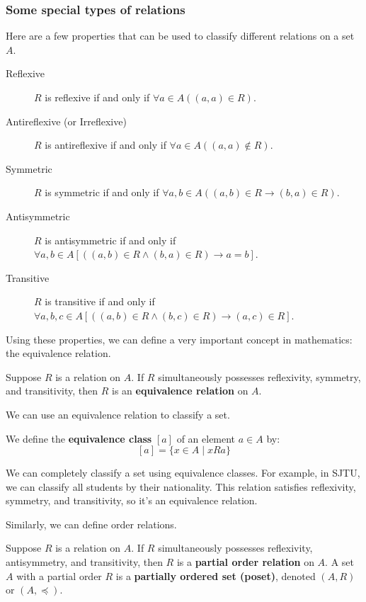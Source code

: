 \subsubsection{Some special types of relations}
Here are a few properties that can be used to classify different relations on a set $A$.
\begin{description}
    \item[Reflexive] $R$ is reflexive if and only if $\forall a \in A ((a,a) \in R)$.
    \item[Antireflexive (or Irreflexive)] $R$ is antireflexive if and only if $\forall a \in A ((a,a) \notin R)$.
    \item[Symmetric] $R$ is symmetric if and only if $\forall a,b \in A ((a,b) \in R \to (b,a) \in R)$.
    \item[Antisymmetric] $R$ is antisymmetric if and only if $\forall a,b \in A [((a,b) \in R \wedge (b,a) \in R) \to a = b]$.
    \item[Transitive] $R$ is transitive if and only if $\forall a,b,c \in A [((a,b) \in R \wedge (b,c) \in R) \to (a,c) \in R]$.
\end{description}
Using these properties, we can define a very important concept in mathematics: the equivalence relation.

\begin{definition}
Suppose $R$ is a relation on $A$. If $R$ simultaneously possesses reflexivity, symmetry, and transitivity, then $R$ is an \textbf{equivalence relation} on $A$.
\end{definition}

We can use an equivalence relation to classify a set.
\begin{definition}
We define the \textbf{equivalence class} $[a]$ of an element $a \in A$ by:
$$ [a] = \{ x \in A \mid xRa \} $$
\end{definition}
We can completely classify a set using equivalence classes. For example, in SJTU, we can classify all students by their nationality. This relation satisfies reflexivity, symmetry, and transitivity, so it’s an equivalence relation.

Similarly, we can define order relations.
\begin{definition}
Suppose $R$ is a relation on $A$. If $R$ simultaneously possesses reflexivity, antisymmetry, and transitivity, then $R$ is a \textbf{partial order relation} on $A$. A set $A$ with a partial order $R$ is a \textbf{partially ordered set (poset)}, denoted $(A, R)$ or $(A, \preceq)$.
\end{definition}

